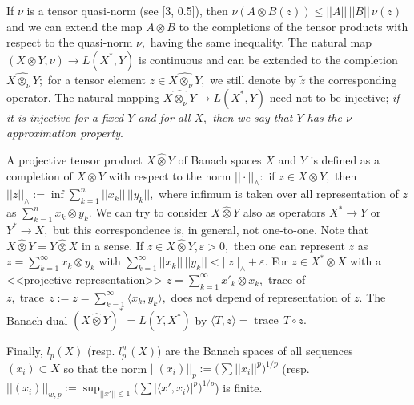 If $\nu$ is a tensor quasi-norm (see [3, 0.5]),
then $\nu(A\otimes B (z))\leqslant ||A||\, ||B||\, \nu(z)$  and we can extend the map
$A\otimes B$ to the comple\-tions of the tensor products with respect to the quasi-norm
$\nu,$ having the same inequality. The natural map $(X\otimes Y, \nu)\to L(X^*, Y)$
is continuous and can be extended to the completion $\widehat{X\otimes_\nu Y};$ for
a tensor element $z\in \widehat{X\otimes_\nu Y},$ we still denote by $\widetilde z$ the corresponding
operator. The natural mapping
  $\widehat{X\otimes_\nu Y}\to L(X^*, Y)$  need not to be injective; {\it if it is injective
  for a fixed $Y$ and for all $X,$ then we say that $Y$ has the $\nu$-approximation property}.

A projective tensor product $X\widehat\otimes Y$ of Banach spaces $X$ and $Y$ is defined
as a completion of $X\otimes Y$ with respect to the norm $||\cdot||_{\land}:$
if $z\in X\otimes Y,$ then
$ ||z||_\land:= \inf \sum_{k=1}^n ||x_k||\, ||y_k||,
$
where infimum is taken over all representation of $z$ as $\sum_{k=1}^n x_k\otimes y_k.$
We can try to consider
    $X\widehat\otimes Y$ also as operators $X^*\to Y$ or $Y^*\to X,$ but this
    correspondence is, in general, not one-to-one.
Note that $X\widehat\otimes Y= Y\widehat\otimes X$ in a sense.
If $z\in X\widehat\otimes Y, \varepsilon>0,$ then one can represent $z$ as
$z=\sum_{k=1}^\infty x_k\otimes y_k$ with $\sum_{k=1}^\infty ||x_k||\, ||y_k||<||z||_\land+\varepsilon.$
For $z\in X^*\widehat\otimes X$ with a <<projective representation>> $z=\sum_{k=1}^\infty x'_k\otimes x_k,$
trace of $z, \operatorname{trace}\, z:=z=\sum_{k=1}^\infty \langle x_k, y_k\rangle,$ does not depend of representation of $z.$
The Banach dual $(X\widehat\otimes Y)^*= L(Y,X^*)$ by $\langle T, z\rangle=\operatorname{trace}\, T\circ z.$

Finally,
$l_p(X)$ (resp. $l^w_p(X)$) are the Banach spaces of all sequences  $(x_i)\subset X$ so that
the norm  $ ||(x_i)||_p:=\big(\sum ||x_i||^p\big)^{1/p}$
(resp. $||(x_i)||_{w,p}:= \sup_{||x'||\leqslant1}\big(\sum |\langle x', x_i\rangle|^p\big)^{1/p}$) is finite.

   \hspace{-0.2em}{\bf Below $0<r, s\leqslant1,$ $0< p,q \leqslant\infty$ and $1/r+1/p+1/q=1/\beta\geqslant1.$}


      \medskip

